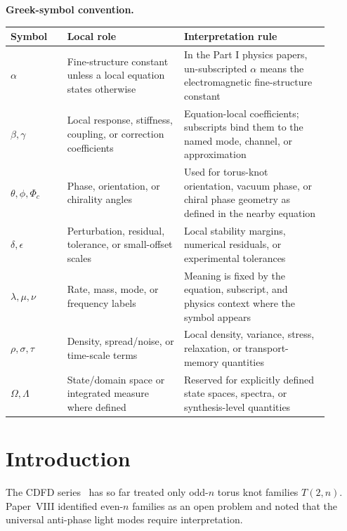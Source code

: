 \documentclass[11pt]{article}
\begin{document}
\noindent\textbf{Greek-symbol convention.}
\begin{center}
{\small
\begin{tabular}{p{0.16\linewidth}p{0.33\linewidth}p{0.41\linewidth}}
\hline
Symbol & Local role & Interpretation rule \\
\hline
$\alpha$ & Fine-structure constant unless a local equation states otherwise & In the Part I physics papers, un-subscripted $\alpha$ means the electromagnetic fine-structure constant \\
$\beta,\gamma$ & Local response, stiffness, coupling, or correction coefficients & Equation-local coefficients; subscripts bind them to the named mode, channel, or approximation \\
$\theta,\phi,\Phi_c$ & Phase, orientation, or chirality angles & Used for torus-knot orientation, vacuum phase, or chiral phase geometry as defined in the nearby equation \\
$\delta,\epsilon$ & Perturbation, residual, tolerance, or small-offset scales & Local stability margins, numerical residuals, or experimental tolerances \\
$\lambda,\mu,\nu$ & Rate, mass, mode, or frequency labels & Meaning is fixed by the equation, subscript, and physics context where the symbol appears \\
$\rho,\sigma,\tau$ & Density, spread/noise, or time-scale terms & Local density, variance, stress, relaxation, or transport-memory quantities \\
$\Omega,\Lambda$ & State/domain space or integrated measure where defined & Reserved for explicitly defined state spaces, spectra, or synthesis-level quantities \\
\hline
\end{tabular}
}
\end{center}


\section{Introduction}

The CDFD series~\cite{MujjabiI2026,MujjabiII2026,MujjabiIII2026,%
MujjabiIV2026,MujjabiV2026,MujjabiVI2026,MujjabiVII2026,MujjabiVIII2026}
has so far treated only odd-$n$ torus knot families $T(2,n)$.
Paper~VIII identified even-$n$ families as an open problem and noted
that the universal anti-phase light modes require interpretation.
\end{document}

